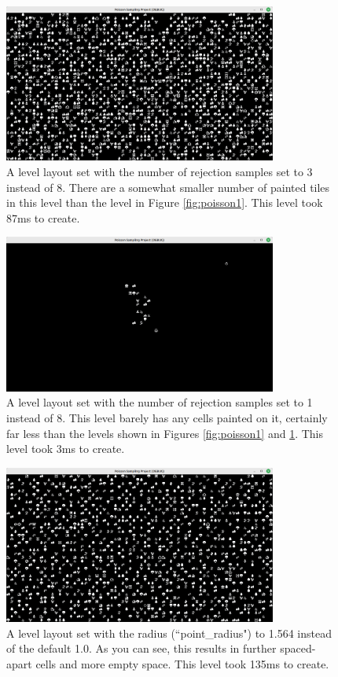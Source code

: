 \begin{figure}[H]
    \centering
    \includegraphics[width=0.8\textwidth]{Images/poisson-3-samples.png}
    \caption{A level layout set with the number of rejection samples set to 3 instead of 8. There are a somewhat smaller number of painted tiles in this level than the level in Figure \ref{fig:poisson1}. This level took 87ms to create.}
    \label{fig:poisson2}
\end{figure}

\begin{figure}[H]
    \centering
    \includegraphics[width=0.8\textwidth]{Images/poisson-1-sample.png}
    \caption{A level layout set with the number of rejection samples set to 1 instead of 8. This level barely has any cells painted on it, certainly far less than the levels shown in Figures \ref{fig:poisson1} and \ref{fig:poisson2}. This level took 3ms to create.}
    \label{fig:poisson3}
\end{figure}

\begin{figure}[H]
    \centering
    \includegraphics[width=0.8\textwidth]{Images/poisson-radius-1.564.png}
    \caption{A level layout set with the radius (``point\_radius") to 1.564 instead of the default 1.0. As you can see, this results in further spaced-apart cells and more empty space. This level took 135ms to create.}
    \label{fig:poisson4}
\end{figure}

